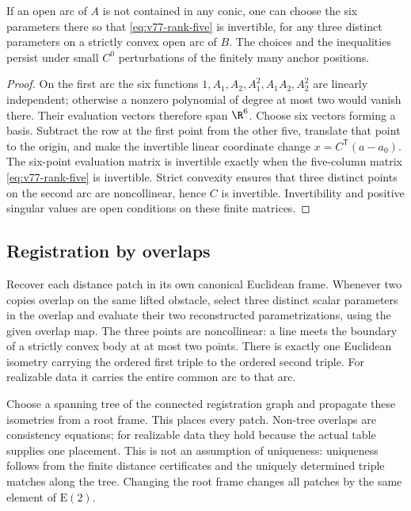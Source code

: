 \begin{lemma}
\label{lem:v77-nonconic-certificate}
If an open arc of $A$ is not contained in any conic, one can choose the
six parameters there so that \eqref{eq:v77-rank-five} is invertible,
for any three distinct parameters on a strictly convex open arc of $B$.
The choices and the inequalities persist under small $C^0$
perturbations of the finitely many anchor positions.
\end{lemma}
\begin{proof}
On the first arc the six functions
$1,A_1,A_2,A_1^2,A_1A_2,A_2^2$ are linearly independent; otherwise
a nonzero polynomial of degree at most two would vanish there.
Their evaluation vectors therefore span $\R^6$.  Choose six vectors
forming a basis.  Subtract the row at the first point from the other
five, translate that point to the origin, and make the invertible linear
coordinate change $x=C^\mathsf T(a-a_0)$.  The six-point evaluation
matrix is invertible exactly when the five-column matrix
\eqref{eq:v77-rank-five} is invertible.  Strict convexity ensures that
three distinct points on the second arc are noncollinear, hence $C$
is invertible.  Invertibility and positive singular values are open
conditions on these finite matrices.
\end{proof}

\subsection{Registration by overlaps}

Recover each distance patch in its own canonical Euclidean frame.
Whenever two copies overlap on the same lifted obstacle, select three
distinct scalar parameters in the overlap and evaluate their two
reconstructed parametrizations, using the given overlap map.  The
three points are noncollinear: a line meets the boundary of a strictly
convex body at at most two points.  There is exactly one Euclidean
isometry carrying the ordered first triple to the ordered second triple.
For realizable data it carries the entire common arc to that arc.

Choose a spanning tree of the connected registration graph and propagate
these isometries from a root frame.  This places every patch.  Non-tree
overlaps are consistency equations; for realizable data they hold
because the actual table supplies one placement.  This is not an
assumption of uniqueness: uniqueness follows from the finite distance
certificates and the uniquely determined triple matches along the tree.
Changing the root frame changes all patches by the same element of
$\mathrm E(2)$.

